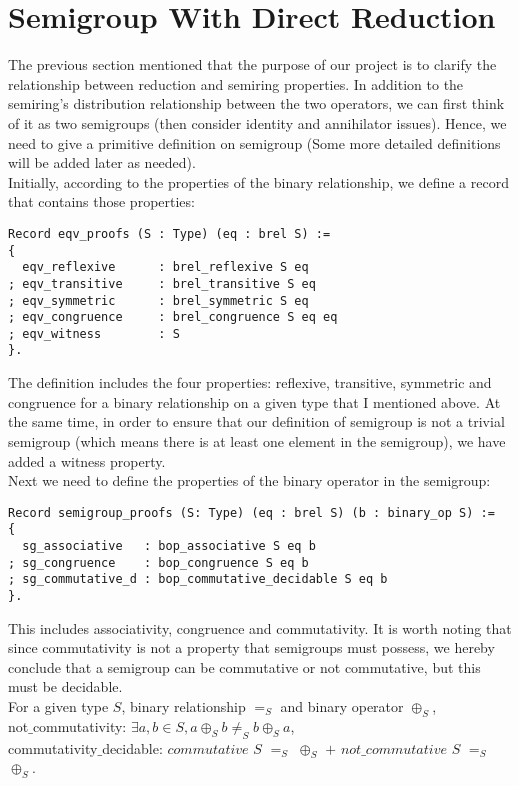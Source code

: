 \documentclass[a4paper,12pt,twoside,openright]{report}
\begin{document}
\section{Semigroup With Direct Reduction}
The previous section mentioned that the purpose of our project is to clarify the relationship between reduction and semiring properties. 
In addition to the semiring's distribution relationship between the two operators, we can first think of it as two semigroups (then consider identity and annihilator issues).
Hence, we need to give a primitive definition on semigroup (Some more detailed definitions will be added later as needed).\\
Initially, according to the properties of the binary relationship, we define a record that contains those properties:
\begin{lstlisting}[]
Record eqv_proofs (S : Type) (eq : brel S) :=
{
  eqv_reflexive      : brel_reflexive S eq            
; eqv_transitive     : brel_transitive S eq           
; eqv_symmetric      : brel_symmetric S eq
; eqv_congruence     : brel_congruence S eq eq                                      
; eqv_witness        : S                                      
}.
\end{lstlisting}
The definition includes the four properties: reflexive, transitive, symmetric and congruence for a binary relationship on a given type that I mentioned above. 
At the same time, in order to ensure that our definition of semigroup is not a trivial semigroup (which means there is at least one element in the semigroup), we have added a witness property.\\
Next we need to define the properties of the binary operator in the semigroup:
\begin{lstlisting}[]
Record semigroup_proofs (S: Type) (eq : brel S) (b : binary_op S) := 
{
  sg_associative   : bop_associative S eq b
; sg_congruence    : bop_congruence S eq b
; sg_commutative_d : bop_commutative_decidable S eq b                                      
}.
\end{lstlisting}
This includes associativity, congruence and commutativity. 
It is worth noting that since commutativity is not a property that semigroups must possess, we hereby conclude that a semigroup can be commutative or not commutative, but this must be decidable.\\
For a given type $S$, binary relationship $=_S$ and binary operator $\oplus_S$,\\
not$\_$commutativity: $\exists a,b\in S, a \oplus_S b \not=_S b \oplus_S a$,\\
commutativity$\_$decidable: $commutative$ $S$ $=_S$ $\oplus_S$ $+$ $not\_commutative$ $S$ $=_S$ $\oplus_S$.\\
\end{document}
